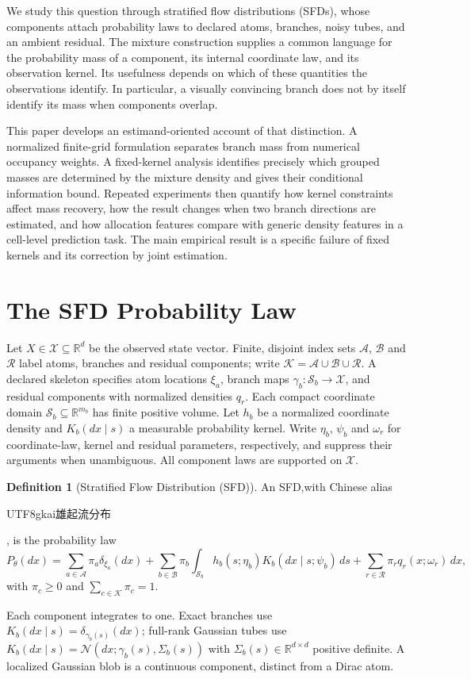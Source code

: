 \documentclass[10pt]{article}
\newcommand{\R}{\mathbb R}
\newcommand{\Normal}{\mathcal N}
\theoremstyle{definition}
\newtheorem{definition}{Definition}
\theoremstyle{plain}
\newcommand{\SFDChineseName}{%
  \begingroup\normalfont\begin{CJK*}{UTF8}{gkai}雄起流分布\end{CJK*}\endgroup}
\begin{document}
We study this question through stratified flow distributions (SFDs), whose
components attach probability laws to declared atoms, branches, noisy tubes,
and an ambient residual. The mixture construction supplies a common language
for the probability mass of a component, its internal coordinate law, and
its observation kernel. Its usefulness depends on which of these quantities
the observations identify. In particular, a visually convincing branch does
not by itself identify its mass when components overlap.

This paper develops an estimand-oriented account of that distinction. A
normalized finite-grid formulation separates branch mass from numerical
occupancy weights. A fixed-kernel analysis identifies precisely which
grouped masses are determined by the mixture density and gives their
conditional information bound. Repeated experiments then quantify how
kernel constraints affect mass recovery, how the result changes when two
branch directions are estimated, and how allocation features compare with
generic density features in a cell-level prediction task. The main empirical
result is a specific failure of fixed kernels and its correction by joint
estimation.



\section{The SFD Probability Law}
\label{sec:law}
Let $X\in\mathcal X\subseteq\R^d$ be the observed state vector. Finite,
disjoint index sets $\mathcal A$, $\mathcal B$ and $\mathcal R$ label atoms,
branches and residual components; write
$\mathcal K=\mathcal A\cup\mathcal B\cup\mathcal R$.
A declared skeleton specifies atom locations $\xi_a$, branch maps
$\gamma_b:\mathcal S_b\to\mathcal X$, and residual components with normalized
densities $q_r$. Each compact coordinate domain
$\mathcal S_b\subseteq\R^{m_b}$ has finite positive volume. Let $h_b$ be a
normalized coordinate density and $K_b(dx\mid s)$ a measurable probability
kernel. Write $\eta_b$, $\psi_b$ and $\omega_r$ for coordinate-law,
kernel and residual parameters, respectively, and suppress their arguments
when unambiguous. All component laws are supported on $\mathcal X$.
\begin{definition}[Stratified Flow Distribution (SFD)]
An SFD,\label{def:sfd} with Chinese alias \SFDChineseName, is the probability law
\begin{equation}
 P_\theta(dx)=\sum_{a\in\mathcal A}\pi_a\delta_{\xi_a}(dx)
  +\sum_{b\in\mathcal B}\pi_b\int_{\mathcal S_b}
           h_b(s;\eta_b)K_b(dx\mid s;\psi_b)\,ds
  +\sum_{r\in\mathcal R}\pi_rq_r(x;\omega_r)\,dx,
 \label{eq:law}
\end{equation}
with $\pi_c\ge0$ and $\sum_{c\in\mathcal K}\pi_c=1$.
\end{definition}
Each component integrates to one. Exact branches use
$K_b(dx\mid s)=\delta_{\gamma_b(s)}(dx)$;
full-rank Gaussian tubes use
$K_b(dx\mid s)=\Normal(dx;\gamma_b(s),\Sigma_b(s))$ with
$\Sigma_b(s)\in\R^{d\times d}$ positive definite. A localized Gaussian blob
is a continuous component, distinct from a Dirac atom.
\end{document}
